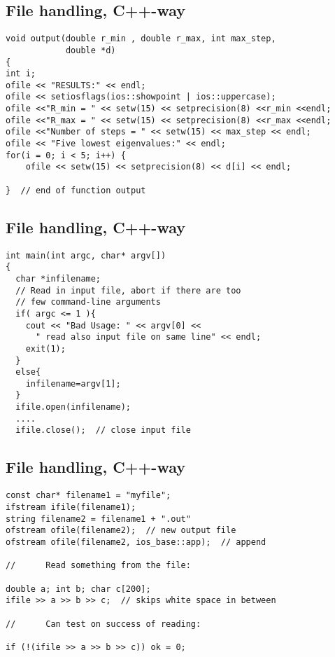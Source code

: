 \documentclass[%
oneside,                 %
final,                   %
10pt]{article}
\begin{document}
\subsection*{File handling, C++-way}

\begin{verbatim}
void output(double r_min , double r_max, int max_step,
            double *d)
{
int i;
ofile << "RESULTS:" << endl;
ofile << setiosflags(ios::showpoint | ios::uppercase);
ofile <<"R_min = " << setw(15) << setprecision(8) <<r_min <<endl;
ofile <<"R_max = " << setw(15) << setprecision(8) <<r_max <<endl;
ofile <<"Number of steps = " << setw(15) << max_step << endl;
ofile << "Five lowest eigenvalues:" << endl;
for(i = 0; i < 5; i++) {
    ofile << setw(15) << setprecision(8) << d[i] << endl;

}  // end of function output
\end{verbatim}

\subsection*{File handling, C++-way}

\begin{verbatim}
int main(int argc, char* argv[])
{
  char *infilename;
  // Read in input file, abort if there are too
  // few command-line arguments
  if( argc <= 1 ){
    cout << "Bad Usage: " << argv[0] <<
      " read also input file on same line" << endl;
    exit(1);
  }
  else{
    infilename=argv[1];
  }
  ifile.open(infilename);
  ....
  ifile.close();  // close input file
\end{verbatim}

\subsection*{File handling, C++-way}

\begin{verbatim}
const char* filename1 = "myfile";
ifstream ifile(filename1);
string filename2 = filename1 + ".out"
ofstream ofile(filename2);  // new output file
ofstream ofile(filename2, ios_base::app);  // append

//      Read something from the file:

double a; int b; char c[200];
ifile >> a >> b >> c;  // skips white space in between

//      Can test on success of reading:

if (!(ifile >> a >> b >> c)) ok = 0;
\end{verbatim}
\end{document}
